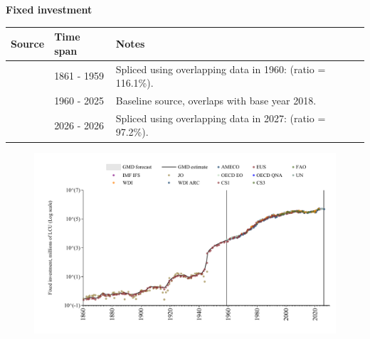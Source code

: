 \documentclass[12pt,a4paper,landscape]{article}
\begin{document}
\begin{adjustbox}{max totalsize={\paperwidth}{\paperheight},center}
\begin{minipage}[t][\textheight][t]{\textwidth}
\vspace*{0.5cm}
{}
\begin{center}
{\Large\bfseries Fixed investment}
\end{center}
\vspace{0.5cm}
\begin{table}[H]
\centering
\small
\begin{tabular}{|l|l|l|}
\hline
\textbf{Source} & \textbf{Time span} & \textbf{Notes} \\
\hline
\rowcolor{white}\cite{CS1_ITA}& 1861 - 1959 &Spliced using overlapping data in 1960: (ratio = 116.1\%). \\
\rowcolor{lightgray}\cite{OECD_EO}& 1960 - 2025 &Baseline source, overlaps with base year 2018. \\
\rowcolor{white}\cite{AMECO}& 2026 - 2026 &Spliced using overlapping data in 2027: (ratio = 97.2\%). \\
\hline
\end{tabular}
\end{table}
\begin{figure}[H]
\centering
\includegraphics[width=\textwidth,height=0.6\textheight,keepaspectratio]{graphs/ITA_finv.pdf}
\end{figure}
\end{minipage}
\end{adjustbox}
\end{document}
